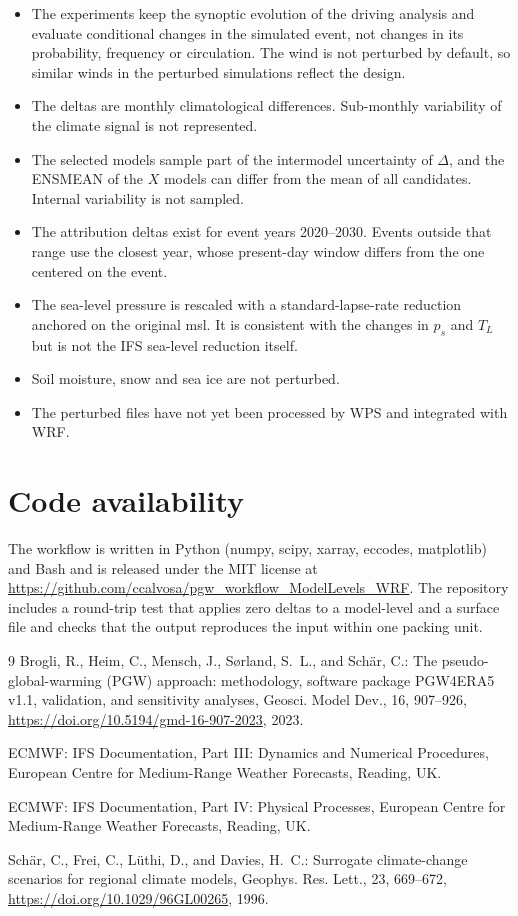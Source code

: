 \documentclass[11pt,a4paper]{article}
\begin{document}
\begin{itemize}
  \item The experiments keep the synoptic evolution of the driving analysis
    and evaluate conditional changes in the simulated event, not changes in
    its probability, frequency or circulation. The wind is not perturbed by
    default, so similar winds in the perturbed simulations reflect the design.
  \item The deltas are monthly climatological differences. Sub-monthly
    variability of the climate signal is not represented.
  \item The selected models sample part of the intermodel uncertainty of
    $\Delta$, and the ENSMEAN of the $X$ models can differ from the mean of
    all candidates. Internal variability is not sampled.
  \item The attribution deltas exist for event years 2020--2030. Events
    outside that range use the closest year, whose present-day window differs
    from the one centered on the event.
  \item The sea-level pressure is rescaled with a standard-lapse-rate
    reduction anchored on the original msl. It is consistent with the changes
    in $p_s$ and $T_L$ but is not the IFS sea-level reduction itself.
  \item Soil moisture, snow and sea ice are not perturbed.
  \item The perturbed files have not yet been processed by WPS and integrated
    with WRF.
\end{itemize}

\section*{Code availability}
The workflow is written in Python (numpy, scipy, xarray, eccodes, matplotlib)
and Bash and is released under the MIT license at
\url{https://github.com/ccalvosa/pgw_workflow_ModelLevels_WRF}. The
repository includes a round-trip test that applies zero deltas to a
model-level and a surface file and checks that the output reproduces the
input within one packing unit.

\begin{thebibliography}{9}
Brogli, R., Heim, C., Mensch, J., S{\o}rland, S.~L., and Sch{\"a}r, C.:
The pseudo-global-warming (PGW) approach: methodology, software package
PGW4ERA5 v1.1, validation, and sensitivity analyses, Geosci. Model Dev., 16,
907--926, \url{https://doi.org/10.5194/gmd-16-907-2023}, 2023.

ECMWF: IFS Documentation, Part III: Dynamics and Numerical Procedures,
European Centre for Medium-Range Weather Forecasts, Reading, UK.

ECMWF: IFS Documentation, Part IV: Physical Processes, European Centre for
Medium-Range Weather Forecasts, Reading, UK.

Sch{\"a}r, C., Frei, C., L{\"u}thi, D., and Davies, H.~C.: Surrogate
climate-change scenarios for regional climate models, Geophys. Res. Lett.,
23, 669--672, \url{https://doi.org/10.1029/96GL00265}, 1996.
\end{thebibliography}
\end{document}
